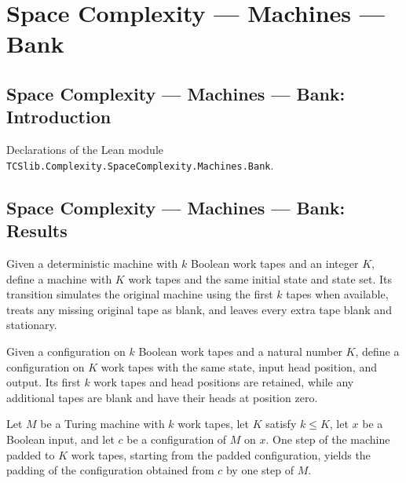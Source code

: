 \section{Space Complexity --- Machines --- Bank}
\subsection*{Space Complexity --- Machines --- Bank: Introduction}

Declarations of the Lean module \texttt{TCSlib.Complexity.SpaceComplexity.Machines.Bank}.

\subsection*{Space Complexity --- Machines --- Bank: Results}

\begin{definition}
\label{Complexity.LogProg.padTM}
\leanok
{}
Given a deterministic machine with $k$ Boolean work tapes and an integer $K$, define a
machine with $K$ work tapes and the same initial state and state set. Its transition
simulates the original machine using the first $k$ tapes when available, treats any
missing original tape as blank, and leaves every extra tape blank and stationary.
\end{definition}

\begin{definition}
\label{Complexity.LogProg.padCfg}
\leanok
{}
Given a configuration on $k$ Boolean work tapes and a natural number $K$, define a
configuration on $K$ work tapes with the same state, input head position, and output.
Its first $k$ work tapes and head positions are retained, while any additional tapes are
blank and have their heads at position zero.
\end{definition}

\begin{lemma}
\label{Complexity.LogProg.padTM_step}
\leanok
{}
Let $M$ be a Turing machine with $k$ work tapes, let $K$ satisfy $k\le K$, let $x$ be a
Boolean input, and let $c$ be a configuration of $M$ on $x$. One step of the machine
padded to $K$ work tapes, starting from the padded configuration, yields the padding of
the configuration obtained from $c$ by one step of $M$.
\end{lemma}

